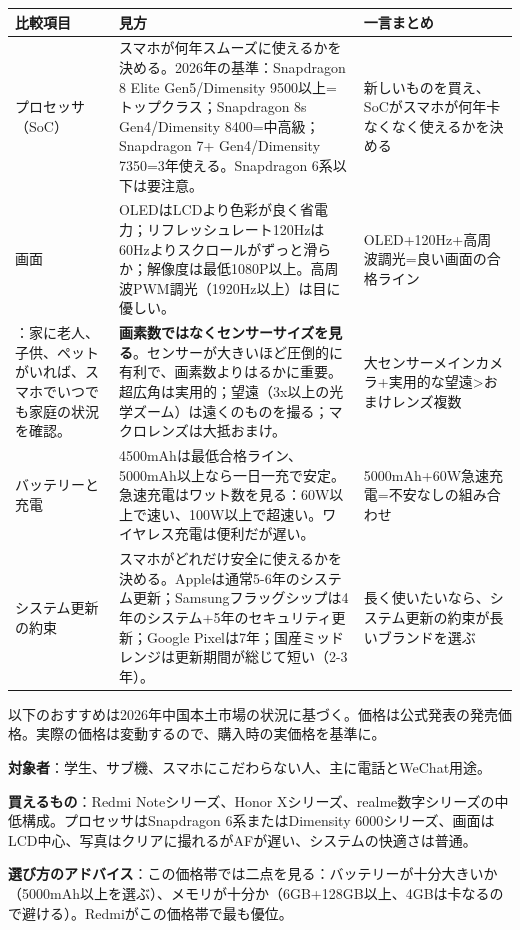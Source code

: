 \begin{center}
\begin{tabularx}{\linewidth}{|X|X|X|}
\hline
\textbf{比較項目} & \textbf{見方} & \textbf{一言まとめ} \tabularnewline
\hline
プロセッサ（SoC） & スマホが何年スムーズに使えるかを決める。2026年の基準：Snapdragon 8 Elite Gen5/Dimensity 9500以上=トップクラス；Snapdragon 8s Gen4/Dimensity 8400=中高級；Snapdragon 7+ Gen4/Dimensity 7350=3年使える。Snapdragon 6系以下は要注意。 & 新しいものを買え、SoCがスマホが何年卡なくなく使えるかを決める \tabularnewline
画面 & OLEDはLCDより色彩が良く省電力；リフレッシュレート120Hzは60Hzよりスクロールがずっと滑らか；解像度は最低1080P以上。高周波PWM調光（1920Hz以上）は目に優しい。 & OLED+120Hz+高周波調光=良い画面の合格ライン \tabularnewline
：家に老人、子供、ペットがいれば、スマホでいつでも家庭の状況を確認。 & \textbf{画素数ではなくセンサーサイズを見る}。センサーが大きいほど圧倒的に有利で、画素数よりはるかに重要。超広角は実用的；望遠（3x以上の光学ズーム）は遠くのものを撮る；マクロレンズは大抵おまけ。 & 大センサーメインカメラ+実用的な望遠>おまけレンズ複数 \tabularnewline
バッテリーと充電 & 4500mAhは最低合格ライン、5000mAh以上なら一日一充で安定。急速充電はワット数を見る：60W以上で速い、100W以上で超速い。ワイヤレス充電は便利だが遅い。 & 5000mAh+60W急速充電=不安なしの組み合わせ \tabularnewline
システム更新の約束 & スマホがどれだけ安全に使えるかを決める。Appleは通常5-6年のシステム更新；Samsungフラッグシップは4年のシステム+5年のセキュリティ更新；Google Pixelは7年；国産ミッドレンジは更新期間が総じて短い（2-3年）。 & 長く使いたいなら、システム更新の約束が長いブランドを選ぶ \tabularnewline
\hline
\end{tabularx}
\end{center}


以下のおすすめは2026年中国本土市場の状況に基づく。価格は公式発表の発売価格。実際の価格は変動するので、購入時の実価格を基準に。


\textbf{対象者}：学生、サブ機、スマホにこだわらない人、主に電話とWeChat用途。

\textbf{買えるもの}：Redmi Noteシリーズ、Honor Xシリーズ、realme数字シリーズの中低構成。プロセッサはSnapdragon 6系またはDimensity 6000シリーズ、画面はLCD中心、写真はクリアに撮れるがAFが遅い、システムの快適さは普通。

\textbf{選び方のアドバイス}：この価格帯では二点を見る：バッテリーが十分大きいか（5000mAh以上を選ぶ）、メモリが十分か（6GB+128GB以上、4GBは卡なるので避ける）。Redmiがこの価格帯で最も優位。

